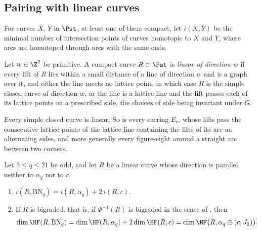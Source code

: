 \subsection{Pairing with linear curves}\label{ss:kh-pairing}
For curves $X$, $Y$ in $\Pst$, at least one of them compact, let $i(X,Y)$ be the minimal number of
intersection points of curves homotopic to $X$ and $Y$, where arcs are homotoped through arcs with
the same ends.

\begin{definition}\label{def:linear}
Let $w\in\Z^2$ be primitive.  A compact curve $R\subset\Pst$ is \emph{linear of direction $w$} if every
lift of $R$ lies within a small distance of a line of direction $w$ and is a graph over it, and
either the line meets no lattice point, in which case $R$ is the simple closed curve of direction
$w$, or the line is a lattice line and the lift passes each of its lattice points on a prescribed
side, the choices of side being invariant under $G$.
\end{definition}

Every simple closed curve is linear.  So is every earring $E_r$, whose lifts pass the consecutive
lattice points of the lattice line containing the lifts of its arc on alternating sides, and more
generally every figure-eight around a straight arc between two corners.

\begin{theorem}\label{thm:pairing-full}
Let $5\le q\le21$ be odd, and let $R$ be a linear curve whose direction is parallel neither to
$\alpha_q$ nor to $c$.
\begin{enumerate}
\item[(a)] $i(R,\mathrm{BN}_q)=i(R,\alpha_q)+2\,i(R,c)$.
\item[(b)] If $R$ is bigraded, that is, if $\Phi^{-1}(R)$ is bigraded in the sense of \cite{KWZ}, then
 \[
  \dim\HF(R,\mathrm{BN}_q)=\dim\HF(R,\alpha_q)+2\dim\HF(R,c)=\dim\HF\bigl(R,\alpha_q\oplus(c,J_2)\bigr).
 \]
\end{enumerate}
\end{theorem}

